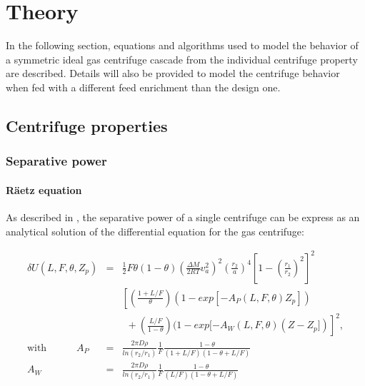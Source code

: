 \section{Theory}

In the following section, equations and algorithms used to model the behavior of
a symmetric ideal gas centrifuge cascade from the individual centrifuge property
are described. Details will also be provided to model the centrifuge behavior
when fed with a different feed enrichment than the design one.

\subsection{Centrifuge properties}

\subsubsection{Separative power}

\paragraph{R\"aetz equation}

As described in \cite{glaser.2008}, the separative power of a single centrifuge
can be express as an analytical solution \cite{raetz.phd} of the
differential equation for the gas centrifuge:

\begin{eqnarray}
    \delta U(L,F,\theta,Z_{p}) &= &\frac{1}{2}
            F\theta(1 - \theta)
            \left(\frac{\Delta M}{2 RT}v_{a}^{2}\right)^{2}
            \left(\frac{r_{2}}{a}\right)^{4}
            \left[1 - \left(\frac{r_{1}}{r_{2}}\right)^{2}\right]^{2}
            \label{eq_raetz}\\
        &&
            \left[
                \left(\frac{1+L/F}{\theta}\right)
                (1- exp[ - A_{P}(L,F,\theta)Z_{p}])  \nonumber  \right. \\
        &&~~ + \left.\left(\frac{L/F}{1 - \theta}\right)
                (1 - exp[ -A_{W}(L,F,\theta)(Z - Z_{p}])\right]^{2}, \nonumber
                \\
    \textrm{with~ ~ ~ ~ ~}
        A_{P} &= &\frac{2\pi D\rho }{ ln(r_{2}/r_{1}) }
                 \frac{ 1 }{ F }
                 \frac{ 1-\theta }{(1+L/F)(1-\theta+L/F) }\\
        A_{W} &= &\frac{2\pi D\rho }{ ln(r_{2}/r_{1}) }
                 \frac{ 1 }{ F }
                 \frac{ 1-\theta }{ (L/F)(1-\theta+L/F) }
\end{eqnarray}

